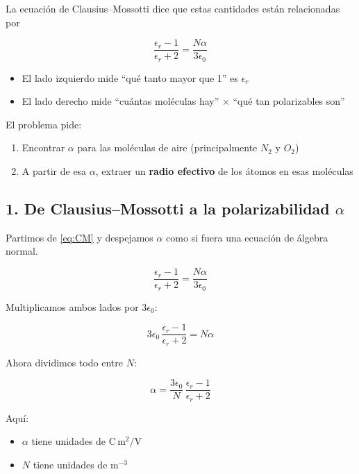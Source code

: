 \documentclass{article}
\begin{document}
La ecuación de Clausius–Mossotti dice que estas cantidades están relacionadas por

\begin{equation}
\frac{\epsilon_{r} - 1}{\epsilon_{r} + 2}
= \frac{N\alpha}{3\epsilon_{0}}
\label{eq:CM}
\end{equation}

\begin{itemize}
  \item El lado izquierdo mide “qué tanto mayor que 1” es $\epsilon_{r}$
  \item El lado derecho mide “cuántas moléculas hay” $\times$ “qué tan polarizables son”
\end{itemize}

El problema pide:

\begin{enumerate}
  \item Encontrar $\alpha$ para las moléculas de aire (principalmente $N_{2}$ y $O_{2}$)
  \item A partir de esa $\alpha$, extraer un \textbf{radio efectivo} de los átomos en esas moléculas
\end{enumerate}

\subsection*{1. De Clausius–Mossotti a la polarizabilidad $\alpha$}

Partimos de \eqref{eq:CM} y despejamos $\alpha$ como si fuera una ecuación de álgebra normal.

\[
\frac{\epsilon_{r} - 1}{\epsilon_{r} + 2}
= \frac{N\alpha}{3\epsilon_{0}}
\]

Multiplicamos ambos lados por $3\epsilon_{0}$:

\[
3\epsilon_{0}\,\frac{\epsilon_{r} - 1}{\epsilon_{r} + 2}
= N\alpha
\]

Ahora dividimos todo entre $N$:

\begin{equation}
\alpha = \frac{3\epsilon_{0}}{N}\,\frac{\epsilon_{r} - 1}{\epsilon_{r} + 2}
\label{eq:alpha-general}
\end{equation}

Aquí:
\begin{itemize}
  \item $\alpha$ tiene unidades de \(\text{C}\,\text{m}^{2}/\text{V}\)
  \item $N$ tiene unidades de \(\text{m}^{-3}\)
\end{itemize}
\end{document}
